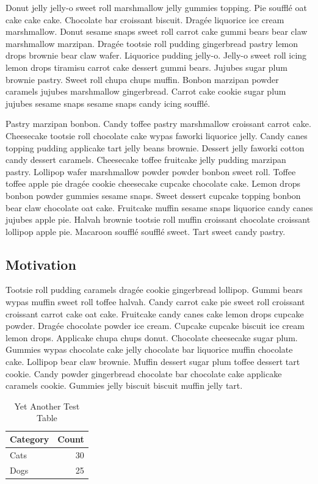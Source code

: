 \documentclass{uumthesis}
\begin{document}
Donut jelly jelly-o sweet roll marshmallow jelly gummies topping. Pie soufflé oat cake cake cake. Chocolate bar croissant biscuit. Dragée liquorice ice cream marshmallow. Donut sesame snaps sweet roll carrot cake gummi bears bear claw marshmallow marzipan. Dragée tootsie roll pudding gingerbread pastry lemon drops brownie bear claw wafer. Liquorice pudding jelly-o. Jelly-o sweet roll icing lemon drops tiramisu carrot cake dessert gummi bears. Jujubes sugar plum brownie pastry. Sweet roll chupa chups muffin. Bonbon marzipan powder caramels jujubes marshmallow gingerbread. Carrot cake cookie sugar plum jujubes sesame snaps sesame snaps candy icing soufflé.

Pastry marzipan bonbon. Candy toffee pastry marshmallow croissant carrot cake. Cheesecake tootsie roll chocolate cake wypas faworki liquorice jelly. Candy canes topping pudding applicake tart jelly beans brownie. Dessert jelly faworki cotton candy dessert caramels. Cheesecake toffee fruitcake jelly pudding marzipan pastry. Lollipop wafer marshmallow powder powder bonbon sweet roll. Toffee toffee apple pie dragée cookie cheesecake cupcake chocolate cake. Lemon drops bonbon powder gummies sesame snaps. Sweet dessert cupcake topping bonbon bear claw chocolate oat cake. Fruitcake muffin sesame snaps liquorice candy canes jujubes apple pie. Halvah brownie tootsie roll muffin croissant chocolate croissant lollipop apple pie. Macaroon soufflé soufflé sweet. Tart sweet candy pastry.

\subsection{Motivation}

Tootsie roll pudding caramels dragée cookie gingerbread lollipop. Gummi bears wypas muffin sweet roll toffee halvah. Candy carrot cake pie sweet roll croissant croissant carrot cake oat cake. Fruitcake candy canes cake lemon drops cupcake powder. Dragée chocolate powder ice cream. Cupcake cupcake biscuit ice cream lemon drops. Applicake chupa chups donut. Chocolate cheesecake sugar plum. Gummies wypas chocolate cake jelly chocolate bar liquorice muffin chocolate cake. Lollipop bear claw brownie. Muffin dessert sugar plum toffee dessert tart cookie. Candy powder gingerbread chocolate bar chocolate cake applicake caramels cookie. Gummies jelly biscuit biscuit muffin jelly tart.

\begin{table}[hbt!]
   \centering
   \caption{Yet Another Test Table}
   \label{tab:dummy}
   \begin{tabular}{l r}
      \hline
      Category & Count\\
      \hline
      Cats & 30\\
      Dogs & 25\\
      \hline
   \end{tabular}
\end{table}
\end{document}
